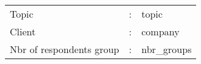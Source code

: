 \documentclass{article}
\begin{document}
  \begin{tabular}{lll}
   Topic & : & {{ topic }} \\
   Client & : & {{ company }} \\
   Nbr of respondents group & : & {{ nbr_groups }} \\
  \end{tabular}
\end{document}
